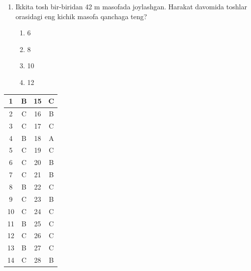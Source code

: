 \begin{enumerate}
\item Ikkita tosh bir-biridan 42 m masofada joylashgan. Harakat davomida toshlar orasidagi eng kichik masofa qanchaga teng?

\begin{enumerate}[label=\Alph*)]
\item 6
\item 8
\item 10
\item 12
\end{enumerate}

\end{enumerate}



\begin{center}
\begin{tabular}{|c|c||c|c|}
\hline
1 & B & 15 & C \\
\hline
2 & C & 16 & B \\
\hline
3 & C & 17 & C \\
\hline
4 & B & 18 & A \\
\hline
5 & C & 19 & C \\
\hline
6 & C & 20 & B \\
\hline
7 & C & 21 & B \\
\hline
8 & B & 22 & C \\
\hline
9 & C & 23 & B \\
\hline
10 & C & 24 & C \\
\hline
11 & B & 25 & C \\
\hline
12 & C & 26 & C \\
\hline
13 & B & 27 & C \\
\hline
14 & C & 28 & B \\
\hline
\end{tabular}
\end{center}









